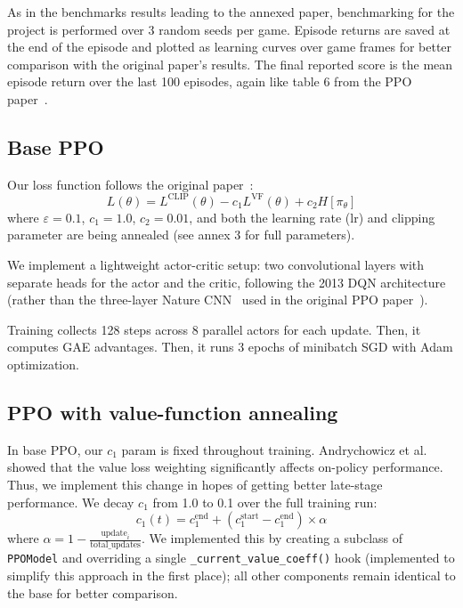 \documentclass{article}
\begin{document}
As in the benchmarks results leading to the annexed paper, 
benchmarking for the project is performed over 3 random seeds 
per game.
Episode returns are saved at the end of the episode and 
plotted as learning curves over game frames for better 
comparison with the original paper's results. The final 
reported score is the mean episode return over the last 
100 episodes, again like table 6 from the PPO paper~\cite{PPOPaper}.

\subsection{Base PPO} %

Our loss function follows the original paper~\cite{PPOPaper}:
$$L(\theta) = L^{\text{CLIP}}(\theta) - c_1 L^{\text{VF}}(\theta) + c_2 H[\pi_\theta]$$
where $\varepsilon=0.1$, $c_1=1.0$, $c_2=0.01$, and both the 
learning rate (lr) and clipping parameter are being annealed (see annex 3 for full parameters).

We implement a lightweight actor-critic setup: two convolutional layers with separate heads for the actor and the critic, following the 2013 DQN architecture (rather than the three-layer Nature CNN~\cite{mnih2015} used in the original PPO paper~\cite{PPOPaper}).

Training collects 128 steps across 8 parallel actors for each 
update. Then, it computes GAE advantages.
Then, it runs 3 epochs of minibatch SGD with 
Adam optimization.

\subsection{PPO with value-function annealing} %

In base PPO, our $c_1$ param is fixed throughout training. 
Andrychowicz et al.~\cite{andry} showed that 
the value loss weighting significantly affects on-policy performance. Thus, we implement this change in hopes of getting better late-stage performance. 
We decay $c_1$ from 1.0 to 0.1 over the full training run:
$$c_1(t) = c_1^{\text{end}} + (c_1^{\text{start}} - c_1^{\text{end}}) \times \alpha$$ 
where $\alpha = 1 - \frac{\text{update}_i}{\text{total\_updates}}$.
We implemented this by creating a subclass of \texttt{PPOModel} and overriding 
a single \texttt{\_current\_value\_coeff()} hook (implemented to simplify this approach in the first place); all other 
components remain identical 
to the base for better comparison.
\end{document}
